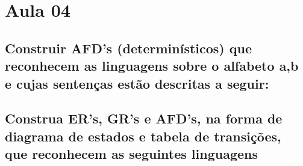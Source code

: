 \section*{Aula 04}
    \subsection{Construir AFD’s (determinísticos) que reconhecem as linguagens sobre o alfabeto {a,b} e cujas sentenças estão descritas a seguir:}
    
    \subsection{Construa ER's, GR's e AFD's, na forma de diagrama de estados e tabela de transições, que reconhecem as seguintes linguagens}

